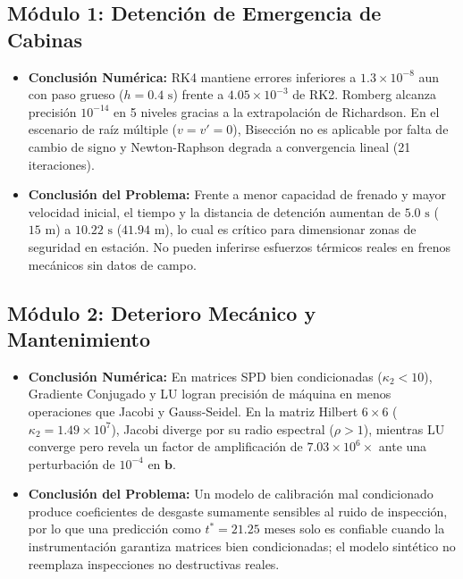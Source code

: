 \documentclass[11pt,a4paper]{article}
\begin{document}
\subsection{Módulo 1: Detención de Emergencia de Cabinas}
\begin{itemize}
    \item \textbf{Conclusión Numérica:} RK4 mantiene errores inferiores a $1.3\times 10^{-8}$ aun con paso grueso ($h=0.4\text{ s}$) frente a $4.05\times 10^{-3}$ de RK2. Romberg alcanza precisión $10^{-14}$ en 5 niveles gracias a la extrapolación de Richardson. En el escenario de raíz múltiple ($v=v'=0$), Bisección no es aplicable por falta de cambio de signo y Newton-Raphson degrada a convergencia lineal (21 iteraciones).
    \item \textbf{Conclusión del Problema:} Frente a menor capacidad de frenado y mayor velocidad inicial, el tiempo y la distancia de detención aumentan de $5.0\text{ s}$ ($15\text{ m}$) a $10.22\text{ s}$ ($41.94\text{ m}$), lo cual es crítico para dimensionar zonas de seguridad en estación. No pueden inferirse esfuerzos térmicos reales en frenos mecánicos sin datos de campo.
\end{itemize}

\subsection{Módulo 2: Deterioro Mecánico y Mantenimiento}
\begin{itemize}
    \item \textbf{Conclusión Numérica:} En matrices SPD bien condicionadas ($\kappa_2 < 10$), Gradiente Conjugado y LU logran precisión de máquina en menos operaciones que Jacobi y Gauss-Seidel. En la matriz Hilbert $6\times 6$ ($\kappa_2=1.49\times 10^7$), Jacobi diverge por su radio espectral ($\rho>1$), mientras LU converge pero revela un factor de amplificación de $7.03\times 10^6\times$ ante una perturbación de $10^{-4}$ en $\mathbf{b}$.
    \item \textbf{Conclusión del Problema:} Un modelo de calibración mal condicionado produce coeficientes de desgaste sumamente sensibles al ruido de inspección, por lo que una predicción como $t^*=21.25\text{ meses}$ solo es confiable cuando la instrumentación garantiza matrices bien condicionadas; el modelo sintético no reemplaza inspecciones no destructivas reales.
\end{itemize}
\end{document}
